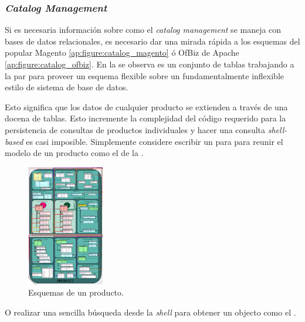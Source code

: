 \subsubsection{\textit{Catalog Management}}

Si es necesaria información sobre como el \textit{catalog management} se maneja con bases de datos relacionales, es necesario dar una mirada rápida a los esquemas del popular Magento \ecommerce \framework \ref{ap:figure:catalog_magento} ó OfBiz de Apache \ref{ap:figure:catalog_ofbiz}. En la   se observa es un conjunto de tablas trabajando a la par para proveer un esquema flexible sobre un fundamentalmente inflexible estilo de sistema de base de datos.

Esto significa que los datos de cualquier producto se extienden a través de una docena de tablas. Esto incremente la complejidad del código requerido para la persistencia de consultas de productos individuales y hacer una consulta \textit{shell-based} es casi imposible. Simplemente considere escribir un \sql \join para para reunir el modelo de un producto como el de la .

\begin{figure}[h!]
	\centering
	\includegraphics[width=0.3\textwidth]{figuras/cap2/magento_product_schema.png}
	\caption{Esquemas de un producto.}
	\label{cap:figure:catalog_magento}
\end{figure}

O realizar una sencilla búsqueda desde la \textit{shell} \mongodb \javascript  para obtener un objecto \json como el .

